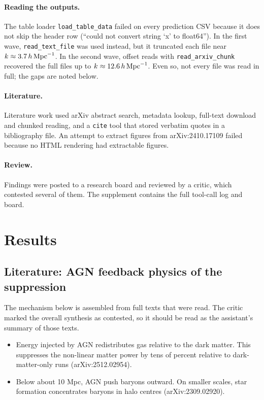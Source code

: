 \documentclass[11pt,a4paper]{article}
\begin{document}
\paragraph{Reading the outputs.} The table loader \texttt{load\_table\_data} failed on every prediction CSV because it does not skip the header row (``could not convert string `x' to float64''). In the first wave, \texttt{read\_text\_file} was used instead, but it truncated each file near $k\approx3.7\,h\,{\rm Mpc}^{-1}$. In the second wave, offset reads with \texttt{read\_arxiv\_chunk} recovered the full files up to $k\approx12.6\,h\,{\rm Mpc}^{-1}$. Even so, not every file was read in full; the gaps are noted below.

\paragraph{Literature.} Literature work used arXiv abstract search, metadata lookup, full-text download and chunked reading, and a \texttt{cite} tool that stored verbatim quotes in a bibliography file. An attempt to extract figures from arXiv:2410.17109 failed because no HTML rendering had extractable figures.

\paragraph{Review.} Findings were posted to a research board and reviewed by a critic, which contested several of them. The supplement contains the full tool-call log and board.

\section{Results}
\subsection{Literature: AGN feedback physics of the suppression}
The mechanism below is assembled from full texts that were read. The critic marked the overall synthesis as contested, so it should be read as the assistant's summary of those texts.
\begin{itemize}
\item Energy injected by AGN redistributes gas relative to the dark matter. This suppresses the non-linear matter power by tens of percent relative to dark-matter-only runs (arXiv:2512.02954).
\item Below about 10 Mpc, AGN push baryons outward. On smaller scales, star formation concentrates baryons in halo centres (arXiv:2309.02920).
\end{itemize}
\end{document}
